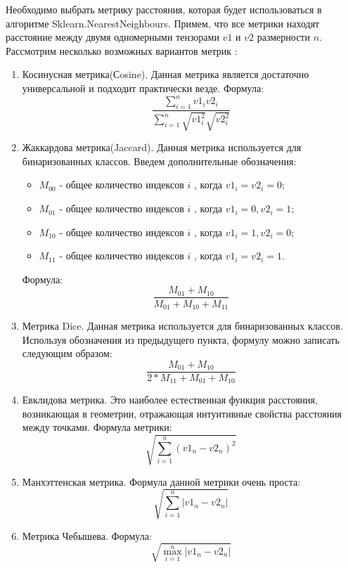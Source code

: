 \documentclass[14pt]{mmcs_article}
\begin{document}
Необходимо выбрать метрику расстояния, которая будет использоваться в алгоритме Sklearn.NearestNeighbours. Примем, что все метрики находят расстояние между двумя одномерными тензорами $v1$ и $v2$ размерности $n$.  Рассмотрим несколько возможных вариантов метрик :
\begin{enumerate}
	\item Косинусная метрика(Сosine). Данная метрика является достаточно универсальной и подходит практически везде. Формула: \begin{equation}
		\frac{\sum_{i=1}^n v1_i v2_i}{\sum_{i=1}^n \sqrt{v1_i^2}\sqrt{v2_i^2}}
	\end{equation} 
	\item Жаккардова метрика(Jaccard). Данная метрика используется для бинаризованных классов. Введем дополнительные обозначения: 
	\begin{itemize}
		\item $M_{00}$ - общее количество индексов $i$ , когда $v1_i = v2_i = 0$;
		\item $M_{01}$ - общее количество индексов $i$ , когда $v1_i = 0,  v2_i = 1$;
		\item $M_{10}$ - общее количество индексов $i$ , когда $v1_i = 1, v2_i = 0$;
		\item $M_{11}$ - общее количество индексов $i$ , когда $v1_i = v2_i = 1$.
	\end{itemize}
	 Формула:
	\begin{equation}
		\frac{M_{01} + M_{10}}{M_{01} + M_{10} + M_{11}}
	\end{equation}
	\item Метрика Dice. Данная метрика используется для бинаризованных классов. Используя обозначения из предыдущего пункта, формулу можно записать следующим образом:
	\begin{equation}
		\frac{M_{01} + M_{10}}{2 * M_{11} + M_{01} + M_{10}}
	\end{equation}
	\item Евклидова метрика. Это наиболее естественная функция расстояния, возникающая в геометрии, отражающая интуитивные свойства расстояния между точками. Формула метрики:
	 \begin{equation}
		\sqrt{\sum_{i=1}^n (v1_n - v2_n)^2 }
	\end{equation} 
	\item Манхэттенская метрика.  Формула данной метрики очень проста: 
	 \begin{equation}
		\sqrt{\sum_{i=1}^n | v1_n - v2_n | }
	\end{equation} 
	\item Метрика Чебышева. Формула:
	 \begin{equation}
		\sqrt{\max_{i=1}^n | v1_n - v2_n | }
	\end{equation} 
\end{enumerate} 
\end{document}

